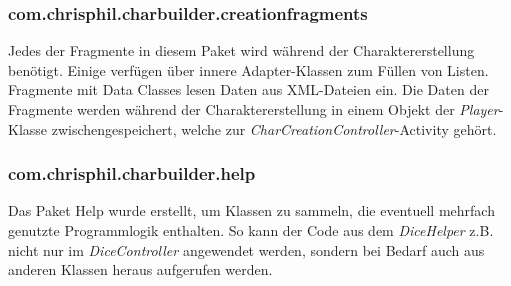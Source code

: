 \subsubsection{com.chrisphil.charbuilder.creationfragments}
Jedes der Fragmente in diesem Paket wird während der Charaktererstellung benötigt. Einige verfügen über innere Adapter-Klassen zum Füllen von Listen. Fragmente mit \grqq Data Classes\grqq{} lesen Daten aus XML-Dateien ein. Die Daten der Fragmente werden während der Charaktererstellung in einem Objekt der \textit{Player}-Klasse zwischengespeichert, welche zur \textit{CharCreationController}-Activity gehört.

\subsubsection{com.chrisphil.charbuilder.help}
Das Paket \grqq Help\grqq{} wurde erstellt, um Klassen zu sammeln, die eventuell mehrfach genutzte Programmlogik enthalten. So kann der Code aus dem \textit{DiceHelper} z.B. nicht nur im \textit{DiceController} angewendet werden, sondern bei Bedarf auch aus anderen Klassen heraus aufgerufen werden.

